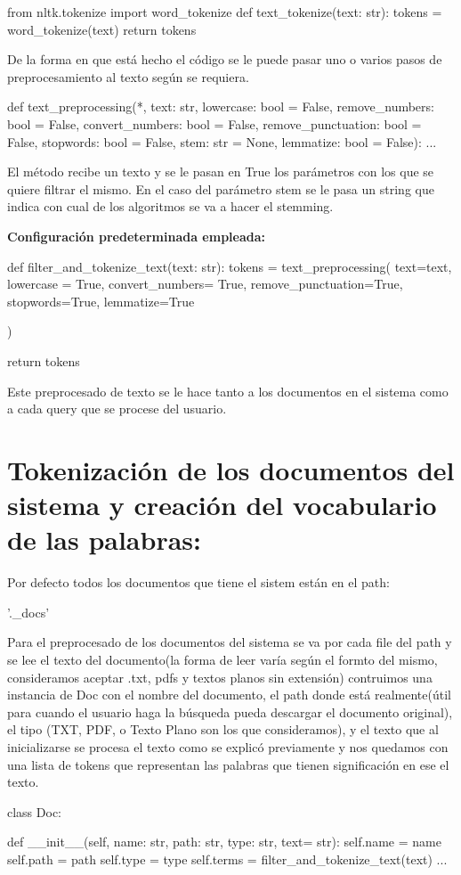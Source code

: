 \documentclass{llncs}
\begin{document}
\begin{python}
from nltk.tokenize import word_tokenize
def text_tokenize(text: str):
    tokens = word_tokenize(text)
    return tokens
\end{python}
\noindent
De la forma en que está hecho el código se le puede pasar uno o varios pasos de preprocesamiento 
al texto según se requiera. 
\\
\begin{python}
def text_preprocessing(*, text: str, 
    lowercase: bool = False, 
    remove_numbers: bool = False,
    convert_numbers: bool = False,
    remove_punctuation: bool = False,
    stopwords: bool = False,
    stem: str = None,
    lemmatize: bool = False):
    ...
\end{python}
El método recibe un texto y se le pasan en True los parámetros con los que
se quiere filtrar el mismo. En el caso del parámetro stem se le pasa un string 
que indica con cual de los algoritmos se va a hacer el stemming. 

\noindent
\textbf{Configuración predeterminada empleada:}
\begin{python}
def filter_and_tokenize_text(text: str):
    tokens = text_preprocessing(
                text=text,
                lowercase = True,
                convert_numbers= True,
                remove_punctuation=True,
                stopwords=True,
                lemmatize=True

            )

    return tokens
\end{python}

\noindent
Este preprocesado de texto se le hace tanto a los documentos en el sistema como
a cada query que se procese del usuario.

\section{Tokenización de los documentos del sistema y creación del vocabulario de las palabras:}
Por defecto todos los documentos que tiene el sistem están en el path:
\begin{python}
'.\system_docs'
\end{python}

Para el preprocesado de los documentos del sistema se va por cada file del path y
se lee el texto del documento(la forma de leer varía según el formto del mismo, consideramos
aceptar .txt, pdfs y textos planos sin extensión) contruimos una instancia de Doc con el nombre 
del documento, el path donde está realmente(útil para cuando el usuario haga la búsqueda
pueda descargar el documento original), el tipo (TXT, PDF, o Texto Plano son los que consideramos),
y el texto que al inicializarse se procesa el texto como se explicó  previamente y nos quedamos con una lista 
de tokens que representan las palabras que tienen significación en ese el texto.
\begin{python}
class Doc:

    def __init__(self, name: str, path: str, type: str, text= str):
        self.name = name
        self.path = path
        self.type = type
        self.terms = filter_and_tokenize_text(text)
    ...
\end{python}
\end{document}
